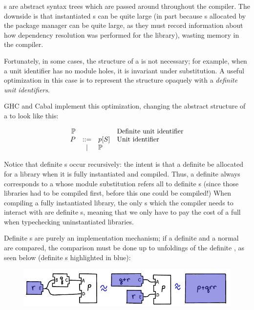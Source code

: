 \Uid{}s are abstract syntax trees which are passed around throughout
the compiler.  The downside is that instantiated \uid{}s
can be quite large (in part because \cid{}s allocated by the
package manager can be quite large, as they must record information
about how dependency resolution was performed for the library),
wasting memory in the compiler.

Fortunately, in some cases, the structure of a \uid{} is not necessary;
for example, when a unit identifier has no module holes, it is
invariant under substitution.  A useful optimization in this case
is to represent the structure opaquely with a \emph{definite unit
identifiers}.

GHC and Cabal implement this optimization, changing the
abstract structure of a \uid{} to look like this:

\[
\begin{array}{rcll}
  \mathbb{P} &&& \text{Definite \uid{}} \\
  \UP &::=& \icid{\Up}{S} & \text{\Uid} \\
      & | & \mathbb{P} \\
\end{array}
\]

\noindent
Notice that definite \uid{}s occur recursively: the intent is that a
definite \uid{} be allocated for a library when it is fully instantiated
and compiled.  Thus, a definite \uid{} always corresponds to a \uid{}
whose module substitution refers all to definite \uid{}s (since those
libraries had to be compiled first, before this one could be compiled!)
When compiling a fully instantiated library, the only \uid{}s which the
compiler needs to interact with are definite \uid{}s, meaning that we
only have to pay the cost of a full \uid{} when typechecking uninstantiated
libraries.

Definite \uid{}s are purely an implementation mechanism; if a definite
\uid{} and a normal \uid{} are compared, the comparison must be done
up to unfoldings of the definite \uid{}, as seen below (definite \uid{}s
highlighted in blue):

\begin{figure}[H]
\center\includegraphics{figures/unit-identifier-improvement.pdf}
\end{figure}
